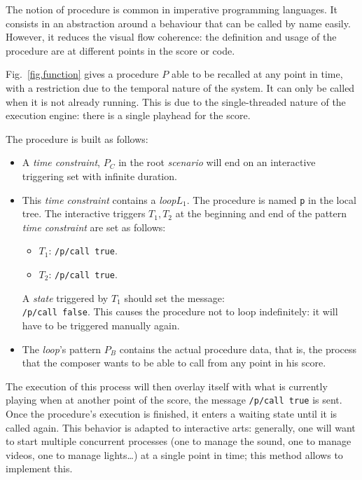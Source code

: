 \documentclass{article}
\newcommand{\scenario}{\textit{scenario}\xspace}
\newcommand{\Loop}{\textit{loop}\xspace}
\newcommand{\state}{\textit{state}\xspace}
\newcommand{\timeconstraint}{\textit{time constraint}\xspace}
\begin{document}
The notion of procedure is common in imperative programming languages.
It consists in an abstraction around a behaviour that can be called 
by name easily.
However, it reduces the visual flow coherence: 
the definition and usage of the procedure are at 
different points in the score or code.

Fig.~\ref{fig.function} gives a 
procedure $P$ able to be recalled at any point in time, with a restriction due to the temporal nature of the system.
It can only be called when it is not already running. 
This is due to the single-threaded nature of the execution engine: there is 
a single playhead for the score.

The procedure is built as follows: 
\begin{itemize}
    \item A \timeconstraint, $P_C$ in the root \scenario will end on an interactive triggering set with infinite duration.
    \item This \timeconstraint contains a \Loop $L_1$. 
    The procedure is named \lstinline{p} in the local tree. 
    The interactive triggers $T_1, T_2$ at the beginning and end of the pattern \timeconstraint are set as follows: 
    \begin{itemize}
        \item $T_1$: \lstinline{/p/call true}.
        \item $T_2$: \lstinline{/p/call true}.
    \end{itemize}
    A \state triggered by $T_1$ should set the message:~\\
    \lstinline{/p/call false}. 
    This causes the procedure not to loop 
    indefinitely: it will have to be triggered manually again.
    \item The \Loop's pattern $P_B$ contains the actual procedure data, that is, the process that the composer wants to be able to call from any point in his score. 
\end{itemize}

The execution of this process will then overlay itself with what is currently playing when at another point of the score, 
the message \lstinline{/p/call true} is sent.
Once the procedure's execution is finished, it enters a waiting state until it is called again.
This behavior is adapted to interactive arts: generally, one will want to start multiple 
concurrent processes (one to manage the sound, one to manage videos, one to manage lights\dots) at a single point in time; this method allows to implement this.
\end{document}
